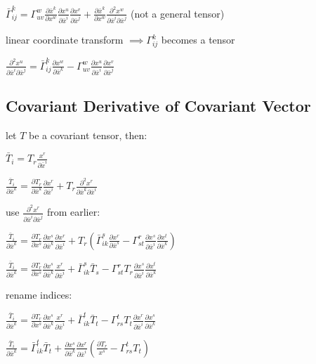\documentclass[8pt,letter]{article}
\begin{document}
\begin{multicols*}{2}
  $\bar{\Gamma}_{ij}^k = \Gamma_{uv}^w \frac{\partial \bar{x}^k}{\partial x^w} \frac{\partial x^u}{\partial \bar{x}^i} \frac{\partial x^v}{\partial \bar{x}^j} + \frac{\partial \bar{x}^k}{\partial x^w} \frac{\partial^2 x^w}{\partial \bar{x}^i \partial \bar{x}^j}$ (not a general tensor)

  linear coordinate transform $\implies \Gamma_{ij}^k$ becomes a tensor

  $\frac{\partial^2 x^u}{\partial \bar{x}^i \partial \bar{x}^j} = \bar{\Gamma}_{ij}^k \frac{\partial x^w}{\partial \bar{x}^k} - \Gamma_{uv}^w \frac{\partial x^u}{\partial \bar{x}^i} \frac{\partial x^v}{\partial \bar{x}^j}$
  
  \subsection{Covariant Derivative of Covariant Vector}

  let $T$ be a covariant tensor, then:

  $\bar{T}_i = T_r \frac{x^r}{\partial \bar{x}^i}$

  $\frac{\bar{T}_i}{\partial \bar{x}^k} = \frac{\partial T_r}{\partial \bar{x}^k} \frac{\partial x^r}{\partial \bar{x}^i} + T_r \frac{\partial^2 x^r}{\partial \bar{x}^k \partial \bar{x}^i}$

  use $\frac{\partial^2 x^r}{\partial \bar{x}^i \partial \bar{x}^j}$ from earlier:

  $\frac{\bar{T}_i}{\partial \bar{x}^k} = \frac{\partial T_r}{\partial x^s} \frac{\partial x^s}{\partial \bar{x}^k} \frac{\partial x^r}{\partial \bar{x}^i} + T_r \left( \bar{\Gamma}_{ik}^s \frac{\partial x^r}{\partial \bar{x}^s} - \Gamma_{st}^r \frac{\partial x^s}{\partial \bar{x}^i} \frac{\partial x^t}{\partial \bar{x}^k} \right)$

  $\frac{\bar{T}_i}{\partial \bar{x}^k} = \frac{\partial T_r}{\partial x^s} \frac{\partial x^s}{\partial \bar{x}^k} \frac{x^r}{\partial \bar{x}^i} + \bar{\Gamma}_{ik}^s \bar{T}_s - \Gamma_{st}^r T_r \frac{\partial x^s}{\partial \bar{x}^i} \frac{\partial x^t}{\partial \bar{x}^k}$

  rename indices:

  $\frac{\bar{T}_i}{\partial \bar{x}^k} = \frac{\partial T_r}{\partial x^s} \frac{\partial x^s}{\partial \bar{x}^k} \frac{x^r}{\partial \bar{x}^i} + \bar{\Gamma}_{ik}^t \bar{T}_t - \Gamma_{rs}^t T_t \frac{\partial x^r}{\partial \bar{x}^i} \frac{\partial x^s}{\partial \bar{x}^k}$

  $\frac{\bar{T}_i}{\partial \bar{x}^k} = \bar{\Gamma}_{ik}^t \bar{T}_t + \frac{\partial x^s}{\partial \bar{x}^k} \frac{\partial x^r}{\partial \bar{x}^i} \left( \frac{\partial T_r}{x^s} - \Gamma_{rs}^t T_t \right)$


\end{multicols*}
\end{document}
